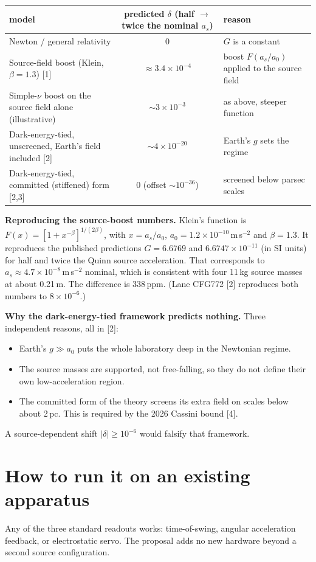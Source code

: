 \documentclass[10pt]{article}
\begin{document}
\begin{center}
\begin{tabular}{lcl}
\toprule
model & predicted $\delta$ (half $\to$ twice the nominal $a_s$) & reason\\
\midrule
Newton / general relativity & 0 & $G$ is a constant\\
Source-field boost (Klein, $\beta=1.3$) [1] & $\approx3.4\times10^{-4}$ & boost $F(a_s/a_0)$ applied to the source field\\
Simple-$\nu$ boost on the source field alone (illustrative) & $\sim3\times10^{-3}$ & as above, steeper function\\
Dark-energy-tied, unscreened, Earth's field included [2] & $\sim4\times10^{-20}$ & Earth's $g$ sets the regime\\
Dark-energy-tied, committed (stiffened) form [2,3] & $0$ (offset $\sim10^{-36}$) & screened below parsec scales\\
\bottomrule
\end{tabular}
\end{center}

\textbf{Reproducing the source-boost numbers.} Klein's function is $F(x)=[1+x^{-\beta}]^{1/(2\beta)}$, with $x=a_s/a_0$, $a_0=1.2\times10^{-10}$\,m\,s$^{-2}$ and $\beta=1.3$. It reproduces the published predictions $G=6.6769$ and $6.6747\times10^{-11}$ (in SI units) for half and twice the Quinn source acceleration. That corresponds to $a_s\approx4.7\times10^{-8}$\,m\,s$^{-2}$ nominal, which is consistent with four 11\,kg source masses at about 0.21\,m. The difference is 338\,ppm. (Lane CFG772 [2] reproduces both numbers to $8\times10^{-6}$.)

\textbf{Why the dark-energy-tied framework predicts nothing.} Three independent reasons, all in [2]:
\begin{itemize}
\item Earth's $g\gg a_0$ puts the whole laboratory deep in the Newtonian regime.
\item The source masses are supported, not free-falling, so they do not define their own low-acceleration region.
\item The committed form of the theory screens its extra field on scales below about 2\,pc. This is required by the 2026 Cassini bound [4].
\end{itemize}
A source-dependent shift $|\delta|\ge10^{-6}$ would falsify that framework.

\section{How to run it on an existing apparatus}
Any of the three standard readouts works: time-of-swing, angular acceleration feedback, or electrostatic servo. The proposal adds no new hardware beyond a second source configuration.
\end{document}
